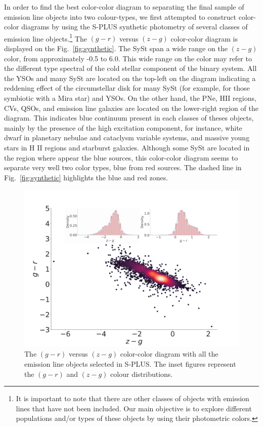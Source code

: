\documentclass[fleqn,usenatbib]{mnras}
\begin{document}
In order to find the best color-color diagram to separating the final sample of
emission line objects into two colour-types, we first attempted to construct color-color
diagrams by using the S-PLUS synthetic photometry of several classes of emission line
objects.\footnote{It is important to note that there are other classes of objects
with emission lines that have not been included. Our main objective is to explore different
populations and/or types of these objects by using their photometric colors.}
The $(g - r)$ versus $(z - g)$ color-color diagram is displayed on
the Fig.~\ref{fig:synthetic}. The SySt span a wide range on the $(z - g)$ color,
  from approximately -0.5 to 6.0. This wide range on the color may refer to the different
  type spectral of the cold stellar component of the binary system. All the YSOs and many
  SySt are located on the top-left on the diagram indicating a reddening effect of the
  circumstellar disk for many SySt (for example, for those symbiotic with a Mira star)
  and YSOs. On the other hand, the PNe, HII regions, CVs, QSOs, and emission line galaxies
  are located on the lower-right region of the diagram. This indicates blue continuum
  present in each classes of theses objects, mainly by the presence of the high excitation
  component, for instance, white dwarf in planetary nebulae and cataclysm variable systems, and
  massive young stars in H II regions and starburst galaxies. Although some SySt are located
  in the region where appear the blue sources, this color-color diagram seems to separate
  very well two color types, blue from red sources. The dashed line in Fig.~\ref{fig:synthetic}
   highlights the blue and red zones.
  
  \begin{figure}
	\includegraphics[width=0.9\linewidth]{Figs/red-blue-colorObjects-gr-edit.jpg}
        \caption{The $(g - r)$ versus $(z - g)$ color-color diagram with all the emission line
        objects selected in S-PLUS. The inset figures represent the $(g - r)$ and  $(z - g)$
        colour distributions.}
    \label{fig:new-color}
\end{figure}
\end{document}
